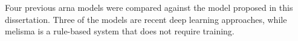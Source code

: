 
Four previous \gls{arna} models were compared against the
model proposed in this dissertation. Three of the models are
recent deep learning approaches, while \gls{melisma} is a
rule-based system that does not require training.
